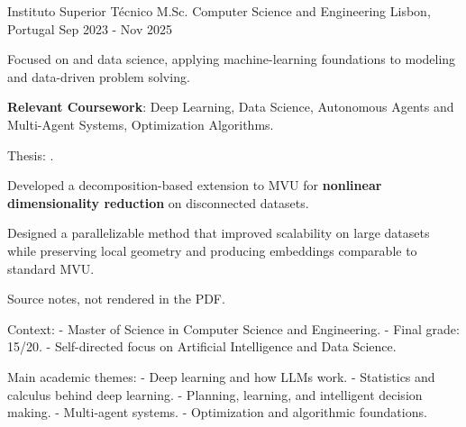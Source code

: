 
\begin{cventries}
  \cventry
    {Instituto Superior Técnico} %
    {M.Sc. Computer Science and Engineering} %
    {Lisbon, Portugal} %
    {Sep 2023 - Nov 2025} %
    {
      \begin{cvitems}
        \item {Focused on  and data science, applying machine-learning foundations to modeling and data-driven problem solving.}
        \item {\textbf{Relevant Coursework}: Deep Learning, Data Science, Autonomous Agents and Multi-Agent Systems, Optimization Algorithms.}
        \item {Thesis: .
          \begin{cvitems}
            \item {Developed a decomposition-based extension to MVU for \textbf{nonlinear dimensionality reduction} on disconnected datasets.}
            \item {Designed a parallelizable method that improved scalability on large datasets while preserving local geometry and producing embeddings comparable to standard MVU.}
          \end{cvitems}
        }
      \end{cvitems}
    }
    {
      Source notes, not rendered in the PDF.

      Context:
      - Master of Science in Computer Science and Engineering.
      - Final grade: 15/20.
      - Self-directed focus on Artificial Intelligence and Data Science.

      Main academic themes:
      - Deep learning and how LLMs work.
      - Statistics and calculus behind deep learning.
      - Planning, learning, and intelligent decision making.
      - Multi-agent systems.
      - Optimization and algorithmic foundations.

}
\end{cventries}
